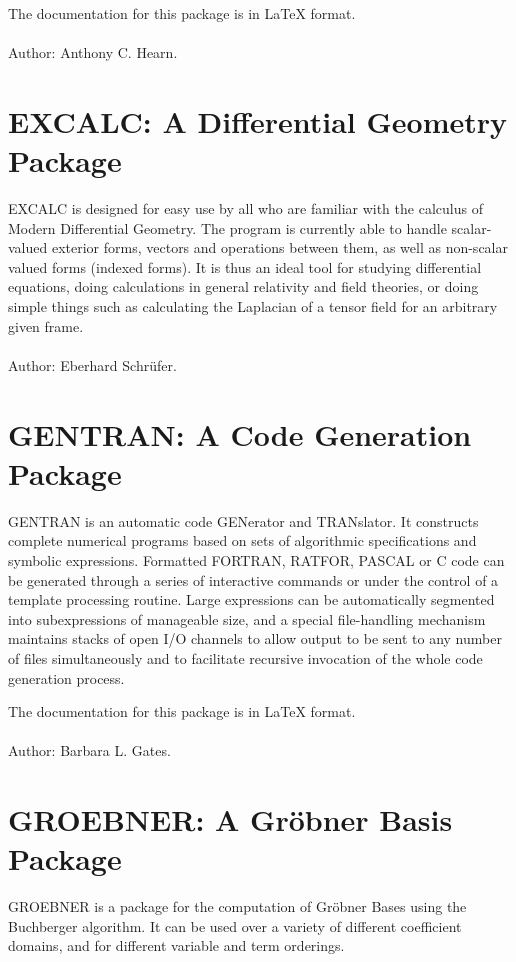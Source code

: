 The documentation for this package is in {\LaTeX} format.
\\ \\
Author:  Anthony C. Hearn.

\section{EXCALC: A Differential Geometry Package} 

EXCALC is designed for easy use by all who are familiar with the calculus
of Modern Differential Geometry. The program is currently able to handle
scalar-valued exterior forms, vectors and operations between them, as well
as non-scalar valued forms (indexed forms). It is thus an ideal tool for
studying differential equations, doing calculations in general relativity
and field theories, or doing simple things such as calculating the
Laplacian of a tensor field for an arbitrary given frame.
\\ \\
Author: Eberhard Schr\"ufer.


\section{GENTRAN: A Code Generation Package} 

GENTRAN is an automatic code GENerator and TRANslator. It constructs
complete numerical programs based on sets of algorithmic specifications
and symbolic expressions. Formatted FORTRAN, RATFOR, PASCAL or C code can be
generated through a series of interactive commands or under the control of
a template processing routine. Large expressions can be automatically
segmented into subexpressions of manageable size, and a special
file-handling mechanism maintains stacks of open I/O channels to allow
output to be sent to any number of files simultaneously and to facilitate
recursive invocation of the whole code generation process.

The documentation for this package is in {\LaTeX} format.
\\ \\
Author: Barbara L. Gates.

\section{GROEBNER: A Gr\"obner Basis Package}

GROEBNER  is a package for the computation of Gr\"obner
Bases using the Buchberger algorithm.  It can be used over a variety of
different coefficient domains, and for different variable and term
orderings.

